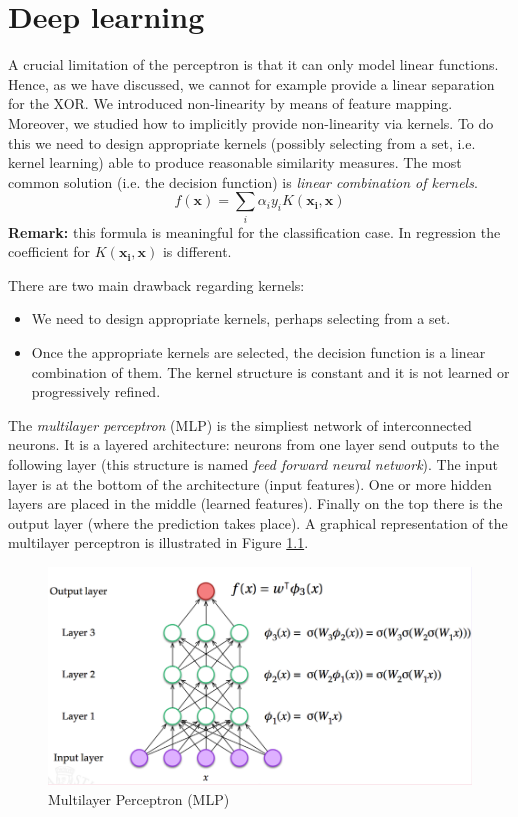 \chapter{Deep learning}
\label{cha:deep_learning}
A crucial limitation of the perceptron is that it can only model linear functions. Hence, as we have discussed, we cannot for example provide a linear separation for the XOR. We introduced non-linearity by means of feature mapping. Moreover, we studied how to implicitly provide non-linearity via kernels. To do this we need to design appropriate kernels (possibly selecting from a set, i.e. kernel learning) able to produce reasonable similarity measures. The most common solution (i.e. the decision function) is \textit{linear combination of kernels}.
$$f(\pmb{x}) = \sum_i \alpha_i y_i K(\pmb{x_i}, \pmb{x})$$
\textbf{Remark:} this formula is meaningful for the classification case. In regression the coefficient for $K(\pmb{x_i}, \pmb{x})$ is different. \newline

There are two main drawback regarding kernels:
\begin{itemize}
    \item We need to design appropriate kernels, perhaps selecting from a set.
    \item Once the appropriate kernels are selected, the decision function is a linear combination of them. The kernel structure is constant and it is not learned or progressively refined.
\end{itemize}

The \textit{multilayer perceptron} (MLP) is the simpliest network of interconnected neurons.  It is a layered architecture: neurons from one layer send outputs to the following layer (this structure is named \textit{feed forward neural network}). The input layer is at the bottom of the architecture (input features). One or more hidden layers are placed in the middle (learned features). Finally on the top there is the output layer (where the prediction takes place). A graphical representation of the multilayer perceptron is illustrated in Figure \ref{fig:mlp}. \newline

\begin{figure}
    \centering
    \includegraphics[width=\textwidth]{images/mlp.png}
    \caption{Multilayer Perceptron (MLP)}
    \label{fig:mlp}
\end{figure}

